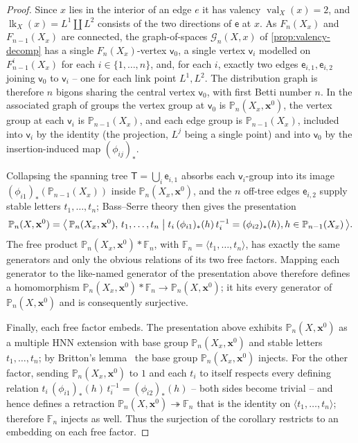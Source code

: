 \documentclass[reqno]{amsart}
\theoremstyle{definition}
\newcommand\bfx{\mathbf{x}}
\newcommand\cG{\mathcal{G}}
\newcommand\sfT{\mathsf{T}}
\newcommand\sfe{\mathsf{e}}
\newcommand\sfv{\mathsf{v}}
\newcommand{\PB}{\mathbb{P}}
\newcommand{\base}{\bfx^0}
\DeclareMathOperator{\lk}{lk}
\DeclareMathOperator{\val}{val}
\numberwithin{equation}{section}
\begin{document}
\begin{proof}
Since \(x\) lies in the interior of an edge \(e\) it has valency
\(\val_X(x)=2\), and \(\lk_X(x)=L^1\coprod L^2\) consists of the two
directions of \(\sfe\) at \(x\). As \(F_n(X_x)\) and \(F_{n-1}(X_x)\) are
connected, the graph-of-spaces \(\cG_n(X,x)\) of
\cref{prop:valency-decomp} has a single
\(F_n(X_x)\)-vertex \(\sfv_0\), a single vertex \(\sfv_i\) modelled on
\(F_{n-1}^i(X_x)\) for each \(i\in\{1,\dots,n\}\), and, for each \(i\),
exactly two edges \(\sfe_{i,1},\sfe_{i,2}\) joining \(\sfv_0\) to \(\sfv_i\) -- one for
each link point \(L^1,L^2\). The distribution graph is therefore
\(n\) bigons sharing the central vertex \(\sfv_0\), with first Betti number
\(n\). In the associated graph of groups the vertex group at \(\sfv_0\) is
\(\PB_n(X_x,\base)\), the vertex group at each \(\sfv_i\) is
\(\PB_{n-1}(X_x)\), and each edge group is \(\PB_{n-1}(X_x)\), included
into \(\sfv_i\) by the identity (the projection, \(L^j\) being a single
point) and into \(\sfv_0\) by the insertion-induced map
\((\phi_{ij})_\ast\).

Collapsing the spanning tree \(\sfT=\bigcup_i \sfe_{i,1}\) absorbs each
\(\sfv_i\)-group into its image \((\phi_{i1})_\ast(\PB_{n-1}(X_x))\) inside
\(\PB_n(X_x,\base)\), and the \(n\) off-tree edges \(\sfe_{i,2}\) supply
stable letters \(t_1,\dots,t_n\); Bass--Serre theory then gives the
presentation
\[
\PB_n(X,\base)=\bigl\langle\,\PB_n(X_x,\base),\,
t_1,\dots,t_n
\bigm|
t_i\,(\phi_{i1})_\ast(h)\,t_i^{-1}=(\phi_{i2})_\ast(h),
h\in\PB_{n-1}(X_x)\,\bigr\rangle .
\]
The free product \(\PB_n(X_x,\base)\ast\mathbb{F}_n\), with
\(\mathbb{F}_n=\langle t_1,\dots,t_n\rangle\), has exactly the same
generators and only the obvious relations of its two free factors.
Mapping each generator to the like-named generator of the
presentation above therefore defines a homomorphism
\(\PB_n(X_x,\base)\ast\mathbb{F}_n\to\PB_n(X,\base)\); it hits every
generator of \(\PB_n(X,\base)\) and is consequently surjective. 

Finally, each free factor embeds. The presentation above exhibits
\(\PB_n(X,\base)\) as a multiple HNN extension with base group
\(\PB_n(X_x,\base)\) and stable letters \(t_1,\dots,t_n\); by Britton's
lemma~\cite{Britton1963} the base group \(\PB_n(X_x,\base)\) injects. For the other
factor, sending \(\PB_n(X_x,\base)\) to \(1\) and each \(t_i\) to itself
respects every defining relation
\(t_i\,(\phi_{i1})_\ast(h)\,t_i^{-1}=(\phi_{i2})_\ast(h)\) -- both sides
become trivial -- and hence defines a retraction
\(\PB_n(X,\base)\twoheadrightarrow\mathbb{F}_n\) that is the identity on
\(\langle t_1,\dots,t_n\rangle\); therefore \(\mathbb{F}_n\) injects as
well. Thus the surjection of the corollary restricts to an embedding on
each free factor.
\end{proof}
\end{document}
